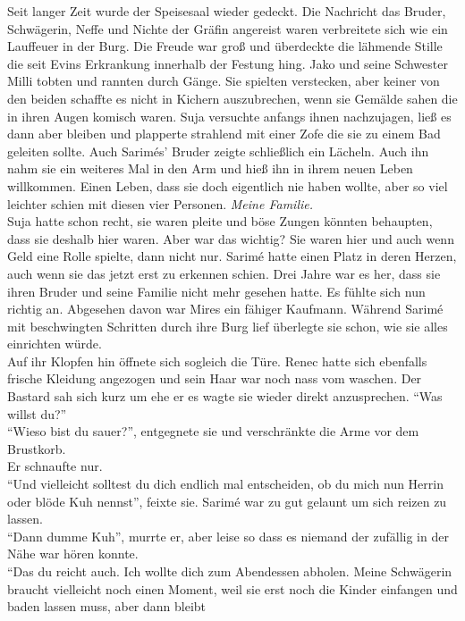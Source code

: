 Seit langer Zeit wurde der Speisesaal wieder gedeckt. Die Nachricht das Bruder, Schwägerin, Neffe 
und Nichte der Gräfin angereist waren verbreitete sich wie ein Lauffeuer in der Burg. Die Freude 
war groß und überdeckte die lähmende Stille die seit Evins Erkrankung innerhalb der Festung hing. 
Jako und seine Schwester Milli tobten und rannten durch Gänge. Sie spielten verstecken, aber keiner 
von den beiden schaffte es nicht in Kichern auszubrechen, wenn sie Gemälde sahen die in ihren Augen 
komisch waren. Suja versuchte anfangs ihnen nachzujagen, ließ es dann aber bleiben und plapperte 
strahlend mit einer Zofe die sie zu einem Bad geleiten sollte. Auch Sarimés' Bruder zeigte 
schließlich ein Lächeln. Auch ihn nahm sie ein weiteres Mal in den Arm und hieß ihn in ihrem neuen 
Leben willkommen. Einen Leben, dass sie doch eigentlich nie haben wollte, aber so viel leichter 
schien mit diesen vier Personen. \textit{Meine Familie.}\\
Suja hatte schon recht, sie waren pleite und böse Zungen könnten behaupten, dass sie deshalb hier 
waren. Aber war das wichtig? Sie waren hier und auch wenn Geld eine Rolle spielte, dann nicht nur. 
Sarimé hatte einen Platz in deren Herzen, auch wenn sie das jetzt erst zu erkennen schien. Drei 
Jahre war es her, dass sie ihren Bruder und seine Familie nicht mehr gesehen hatte. Es fühlte sich 
nun richtig an. Abgesehen davon war Mires ein fähiger Kaufmann. Während Sarimé mit beschwingten 
Schritten durch ihre Burg lief überlegte sie schon, wie sie alles einrichten würde.\\
Auf ihr Klopfen hin öffnete sich sogleich die Türe. Renec hatte sich ebenfalls frische Kleidung 
angezogen und sein Haar war noch nass vom waschen. Der Bastard sah sich kurz um ehe er es wagte sie 
wieder direkt anzusprechen. ``Was willst du?''\\
``Wieso bist du sauer?'', entgegnete sie und verschränkte die Arme vor dem Brustkorb. \\
Er schnaufte nur.\\
``Und vielleicht solltest du dich endlich mal entscheiden, ob du mich nun Herrin oder blöde Kuh 
nennst'', feixte sie. Sarimé war zu gut gelaunt um sich reizen zu lassen. \\
``Dann dumme Kuh'', murrte er, aber leise so dass es niemand der zufällig in der Nähe war hören 
konnte.\\
``Das du reicht auch. Ich wollte dich zum Abendessen abholen. Meine Schwägerin braucht vielleicht 
noch einen Moment, weil sie erst noch die Kinder einfangen und baden lassen muss, aber dann bleibt 
